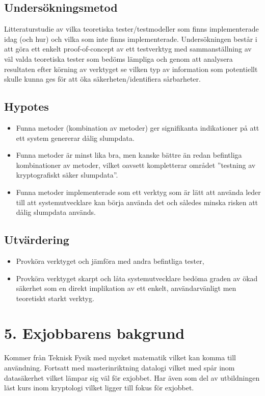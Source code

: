 \documentclass[a4paper,11pt]{report}
\begin{document}
\subsection*{Undersökningsmetod}
Litteraturstudie av vilka teoretiska tester/testmodeller som finns implementerade
idag (och hur) och vilka som inte finns implementerade. Undersökningen består i
att göra ett enkelt proof-of-concept av ett testverktyg med sammanställning av 
väl valda teoretiska tester som bedöms lämpliga och genom att analysera resultaten
efter körning av verktyget se vilken typ av information som potentiellt skulle
kunna ges för att öka säkerheten/identifiera sårbarheter.
\subsection*{Hypotes}
\begin{itemize}
\item Funna metoder (kombination av metoder) ger signifikanta 
    indikationer på att ett system genererar dålig slumpdata.
\item Funna metoder är minst lika bra, men kanske bättre än 
redan befintliga kombinationer av metoder, vilket oavsett 
kompletterar området ''testning av kryptografiskt säker slumpdata''. 
\item Funna metoder implementerade som ett verktyg som är lätt att 
    använda leder till att systemutvecklare kan börja använda det
    och således minska risken att dålig slumpdata används.
\end{itemize}
\subsection*{Utvärdering}
\begin{itemize}
    \item Provköra verktyget och jämföra med andra befintliga tester, 
    \item Provköra verktyget skarpt och låta systemutvecklare bedöma graden
        av ökad säkerhet som en direkt implikation av ett enkelt,
        användarvänligt men teoretiskt starkt verktyg.
\end{itemize}

\section*{5. Exjobbarens bakgrund}

Kommer från Teknisk Fysik med mycket matematik vilket kan komma till användning.
Fortsatt med masterinriktning datalogi vilket med spår inom datasäkerhet vilket
lämpar sig väl för exjobbet.  Har även som del av utbildningen läst kurs inom
kryptologi vilket ligger till fokus för exjobbet.
\end{document}
